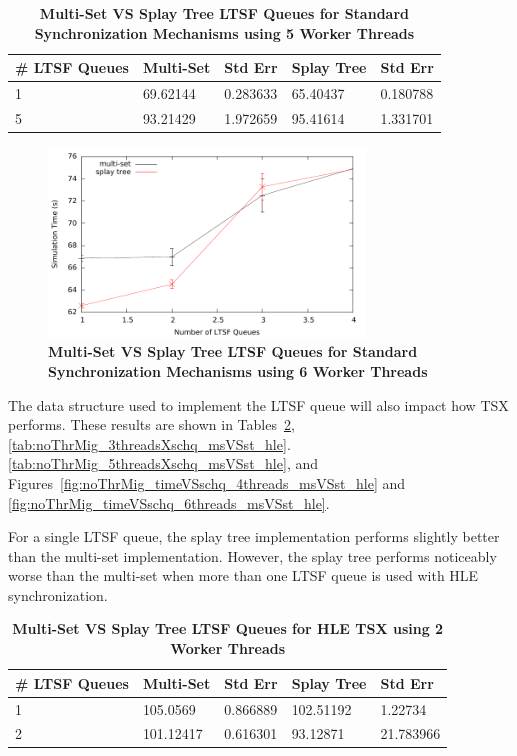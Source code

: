 \documentclass[11pt]{book}
\begin{document}
\begin{table}[H]
\centering
\begin{tabular}{l|p{2cm}|p{2cm}|p{2cm}|p{2cm}}
    \textbf{\# LTSF Queues}&Multi-Set &Std Err &Splay Tree &Std Err\\
    \hline
    \midrule
        1 &69.62144   &0.283633 &65.40437   &0.180788\\ 
        5 &93.21429   &1.972659 &95.41614   &1.331701\\
\end{tabular}
\caption{\textbf{Multi-Set VS Splay Tree LTSF Queues for Standard Synchronization
    Mechanisms using 5 Worker Threads}}\label{tab:noThrMig_5threadsXschq_msVSst_std}
\end{table}

\begin{figure}[H]
    \centering
    \graphicspath{ {./figures/} }
    \includegraphics[width=0.75\textwidth,keepaspectratio]{hugeepidemicsim-NOmig-timeVSschedQs-msVSst-6thread-std}
\caption{\textbf{Multi-Set VS Splay Tree LTSF Queues for Standard Synchronization
    Mechanisms using 6 Worker Threads}}\label{fig:noThrMig_timeVSschq_6threads_msVSst_std}
\end{figure}

The data structure used to implement the LTSF queue will also impact how TSX performs.
These results are shown in Tables~\ref{tab:noThrMig_2threadsXschq_msVSst_hle},
\ref{tab:noThrMig_3threadsXschq_msVSst_hle}.  \ref{tab:noThrMig_5threadsXschq_msVSst_hle},
and Figures~\ref{fig:noThrMig_timeVSschq_4threads_msVSst_hle} and
\ref{fig:noThrMig_timeVSschq_6threads_msVSst_hle}.

For a single LTSF queue, the splay tree implementation performs slightly better
than the multi-set implementation.  However, the splay tree performs
noticeably worse than the multi-set when more than one LTSF queue is used
with HLE synchronization.  

\begin{table}[H]
    \centering
    \begin{tabular}{l|p{2cm}|p{2cm}|p{2cm}|p{2cm}}
        \textbf{\# LTSF Queues}&Multi-Set &Std Err &Splay Tree &Std Err\\
        \hline
        \midrule
            1 &105.0569   &0.866889 &102.51192  &1.22734  \\ 
            2 &101.12417  &0.616301 &93.12871   &21.783966\\
    \end{tabular}
    \caption{\textbf{Multi-Set VS Splay Tree LTSF Queues for HLE TSX using 2 Worker
        Threads}}\label{tab:noThrMig_2threadsXschq_msVSst_hle}
\end{table}
\end{document}
